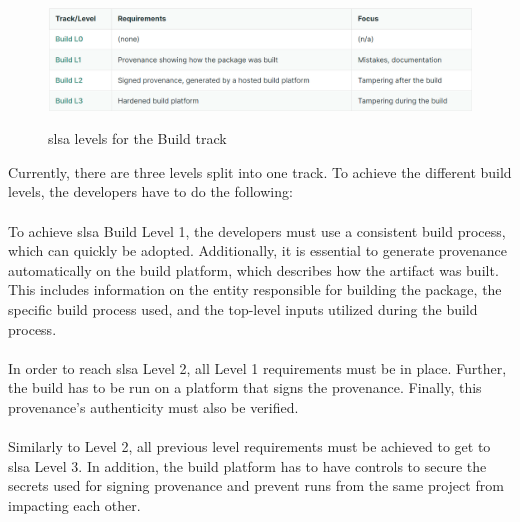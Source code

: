 \vspace{2mm}
\begin{figure}[H]
    \centering
    \includegraphics[width=0.8\columnwidth]{Images/slsalevels.png}
    \caption{\acrshort{slsa} levels for the Build track}\cite{SLSAlevels}
    \label{fig: SLSA levels for the Build track}
\end{figure}
Currently, there are three levels split into one track. To achieve the different build levels, the developers have to do the following:
\\~\\
To achieve \acrshort{slsa} Build Level 1, the developers must use a consistent build process, which can quickly be adopted. Additionally, it is essential to generate \gls{provenance} automatically on the build platform, which describes how the artifact was built. This includes information on the entity responsible for building the package, the specific build process used, and the top-level inputs utilized during the build process.
\\~\\
In order to reach \acrshort{slsa} Level 2, all Level 1 requirements must be in place. Further, the build has to be run on a platform that signs the \gls{provenance}. Finally, this \gls{provenance}'s authenticity must also be verified.
\\~\\
Similarly to Level 2, all previous level requirements must be achieved to get to \acrshort{slsa} Level 3. In addition, the build platform has to have controls to secure the secrets used for signing \gls{provenance} and prevent runs from the same project from impacting each other. 

